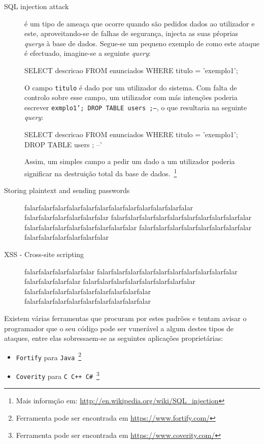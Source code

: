 \begin{description}
\item[SQL injection attack] é um tipo de ameaça que ocorre quando são pedidos dados ao utilizador e este, aproveitando-se de falhas de segurança, injecta as suas pŕoprias 
\emph{querys} à base de dados. Segue-se um pequeno exemplo de como este ataque é efectuado, imagine-se a seguinte \emph{query}:
\begin{code_files}
SELECT descricao FROM enunciados WHERE titulo = 'exemplo1';
\end{code_files}
O campo \texttt{titulo} é dado por um utilizador do sistema. Com falta de controlo sobre esse campo, um utilizador com más intenções poderia escrever \texttt{exmplo1'; DROP TABLE users ;--}, 
o que resultaria na seguinte \emph{query}:
\begin{code_files}
SELECT descricao FROM enunciados WHERE titulo = 'exemplo1'; DROP TABLE users ; --'
\end{code_files}
Assim, um simples campo a pedir um dado a um utilizador poderia significar na destruição total da base de dados.~\footnote{Mais informção em: \url{http://en.wikipedia.org/wiki/SQL_injection}}

\item[Storing plaintext and sending passwords] falarfalarfalarfalarfalarfalarfalarfalarfalarfalarfalarfalar
falarfalarfalarfalarfalarfalar falarfalarfalarfalarfalarfalarfalarfalarfalarfalar falarfalarfalarfalarfalarfalarfalarfalar 
falarfalarfalarfalarfalarfalarfalarfalar falarfalarfalarfalarfalarfalar

\item[XSS - Cross-site scripting] falarfalarfalarfalarfalar
falarfalarfalarfalarfalarfalarfalarfalarfalarfalar
falarfalarfalarfalar
falarfalarfalarfalarfalarfalarfalarfalar
falarfalarfalarfalarfalarfalarfalarfalarfalar
falarfalarfalarfalarfalarfalarfalarfalarfalar
\end{description}

Existem várias ferramentas que procuram por estes padrões e tentam avisar o programador que o seu código pode ser vunerável a algum destes tipos de ataques, 
entre elas sobressaem-se as seguintes aplicações proprietárias:

\begin{itemize}
\item \texttt{Fortify} para \texttt{Java}~\footnote{Ferramenta pode ser encontrada em \url{https://www.fortify.com/}}
\item \texttt{Coverity} para \texttt{C C++ C\#}~\footnote{Ferramenta pode ser encontrada em \url{https://www.coverity.com/}} 
\end{itemize}


